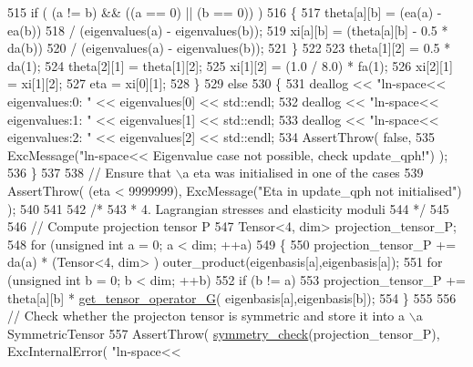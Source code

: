 \begin{DoxyCode}
515                     \textcolor{keywordflow}{if} ( (a != b) && ((a == 0) || (b == 0)) )
516                     \{
517                         theta[a][b] = (ea(a) - ea(b))
518                                       / (eigenvalues(a) - eigenvalues(b));
519                         xi[a][b] = (theta[a][b] - 0.5 * da(b))
520                                    / (eigenvalues(a) - eigenvalues(b));
521                     \}
522 
523             theta[1][2] = 0.5 * da(1);
524             theta[2][1] = theta[1][2];
525             xi[1][2] = (1.0 / 8.0) * fa(1);
526             xi[2][1] = xi[1][2];
527             eta = xi[0][1];
528          \}
529          \textcolor{keywordflow}{else}
530          \{
531             deallog << \textcolor{stringliteral}{"ln-space<< eigenvalues:0: "} << eigenvalues[0] << std::endl;
532             deallog << \textcolor{stringliteral}{"ln-space<< eigenvalues:1: "} << eigenvalues[1] << std::endl;
533             deallog << \textcolor{stringliteral}{"ln-space<< eigenvalues:2: "} << eigenvalues[2] << std::endl;
534             AssertThrow( \textcolor{keyword}{false},
535                          ExcMessage(\textcolor{stringliteral}{"ln-space<< Eigenvalue case not possible, check update\_qph!"}) );
536          \}
537 
538         \textcolor{comment}{// Ensure that \(\backslash\)a eta was initialised in one of the cases}
539          AssertThrow( (eta < 9999999), ExcMessage(\textcolor{stringliteral}{"Eta in update\_qph not initialised"}) );
540 
541 
542         \textcolor{comment}{/*}
543 \textcolor{comment}{         * 4. Lagrangian stresses and elasticity moduli
}
544 \textcolor{comment}{         */}
545 
546         \textcolor{comment}{// Compute projection tensor P}
547          Tensor<4, dim> projection\_tensor\_P;
548          \textcolor{keywordflow}{for} (\textcolor{keywordtype}{unsigned} \textcolor{keywordtype}{int} a = 0; a < dim; ++a)
549          \{
550             projection\_tensor\_P += da(a) * (Tensor<4, dim> ) outer\_product(eigenbasis[a],eigenbasis[a]);
551             \textcolor{keywordflow}{for} (\textcolor{keywordtype}{unsigned} \textcolor{keywordtype}{int} b = 0; b < dim; ++b)
552                 \textcolor{keywordflow}{if} (b != a)
553                     projection\_tensor\_P += theta[a][b] * \hyperlink{functions_8h_a6e649771188b6d625bea6309e77fbd16}{get\_tensor\_operator\_G}(
      eigenbasis[a],eigenbasis[b]);
554          \}
555 
556         \textcolor{comment}{// Check whether the projecton tensor is symmetric and store it into a \(\backslash\)a SymmetricTensor}
557          AssertThrow( \hyperlink{functions_8h_aa37f13547b984cb066e2fcb530b36425}{symmetry\_check}(projection\_tensor\_P), ExcInternalError( \textcolor{stringliteral}{"ln-space<<
}
\end{DoxyCode}
